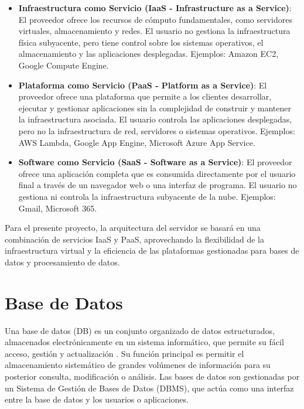\begin{itemize}
    \item \textbf{Infraestructura como Servicio (IaaS - Infrastructure as a Service)}: El proveedor ofrece los recursos de cómputo fundamentales, como servidores virtuales, almacenamiento y redes. El usuario no gestiona la infraestructura física subyacente, pero tiene control sobre los sistemas operativos, el almacenamiento y las aplicaciones desplegadas. Ejemplos: Amazon EC2, Google Compute Engine.

    \item \textbf{Plataforma como Servicio (PaaS - Platform as a Service)}: El proveedor ofrece una plataforma que permite a los clientes desarrollar, ejecutar y gestionar aplicaciones sin la complejidad de construir y mantener la infraestructura asociada. El usuario controla las aplicaciones desplegadas, pero no la infraestructura de red, servidores o sistemas operativos. Ejemplos: AWS Lambda, Google App Engine, Microsoft Azure App Service.

    \item \textbf{Software como Servicio (SaaS - Software as a Service)}: El proveedor ofrece una aplicación completa que es consumida directamente por el usuario final a través de un navegador web o una interfaz de programa. El usuario no gestiona ni controla la infraestructura subyacente de la nube. Ejemplos: Gmail, Microsoft 365.
\end{itemize}

Para el presente proyecto, la arquitectura del servidor se basará en una combinación de servicios IaaS y PaaS, aprovechando la flexibilidad de la infraestructura virtual y la eficiencia de las plataformas gestionadas para bases de datos y procesamiento de datos.



\section{Base de Datos}
\label{sec:base_de_datos}

Una base de datos (DB) es un conjunto organizado de datos estructurados, almacenados electrónicamente en un sistema informático, que permite su fácil acceso, gestión y actualización \cite{mullins2012database}. Su función principal es permitir el almacenamiento sistemático de grandes volúmenes de información para su posterior consulta, modificación o análisis. Las bases de datos son gestionadas por un Sistema de Gestión de Bases de Datos (DBMS), que actúa como una interfaz entre la base de datos y los usuarios o aplicaciones.

